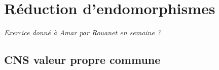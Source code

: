 
%
%

\newpage
\section[Réduction d'endomorphismes]{Réduction d'endomorphismes}
\textit{Exercice donné à Amar par Rouanet en semaine ?}
\subsection{CNS valeur propre commune}

